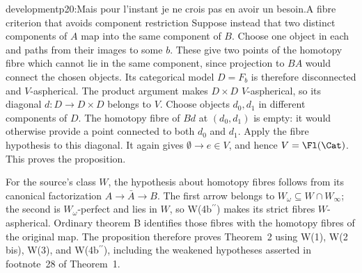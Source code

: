 \begin{dcomment}{development}{p20:Mais pour l'instant je ne crois pas en avoir un besoin.}{A fibre criterion that avoids component restriction}
Suppose instead that two distinct components of \(A\) map into the same component of \(B\). Choose one object in each and paths from their images to some \(b\). These give two points of the homotopy fibre which cannot lie in the same component, since projection to \(BA\) would connect the chosen objects. Its categorical model \(D=F_b\) is therefore disconnected and \(V\)-aspherical. The product argument makes \(D\times D\) \(V\)-aspherical, so its diagonal \(d:D\to D\times D\) belongs to \(V\). Choose objects \(d_0,d_1\) in different components of \(D\). The homotopy fibre of \(Bd\) at \((d_0,d_1)\) is empty: it would otherwise provide a point connected to both \(d_0\) and \(d_1\). Apply the fibre hypothesis to this diagonal. It again gives \(\emptyset\to e\in V\), and hence \(V=\Fl(\Cat)\). This proves the proposition.

For the source's class \(W\), the hypothesis about homotopy fibres follows from its canonical factorization \(A\to\bar A\to B\). The first arrow belongs to \(W_\omega\subseteq W\cap W_\infty\); the second is \(W_\omega\)-perfect and lies in \(W\), so W(4b\(^{\prime\prime}\)) makes its strict fibres \(W\)-aspherical. Ordinary theorem B identifies those fibres with the homotopy fibres of the original map. The proposition therefore proves Theorem~2 using W(1), W(2 bis), W(3), and W(4b\(^{\prime\prime}\)), including the weakened hypotheses asserted in footnote~28 of Theorem~1.
\end{dcomment}

